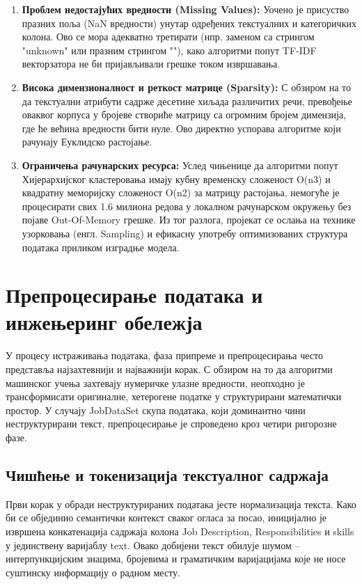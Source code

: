 \documentclass[a4paper,12pt]{report}
\begin{document}
	\begin{enumerate}
	
	\item \textbf{Проблем недостајућих вредности (Missing Values):} Уочено је присуство празних поља (NaN вредности) унутар одређених текстуалних и категоричких колона. Ово се мора адекватно третирати (нпр. заменом са стрингом "unknown" или празним стрингом ""), како алгоритми попут TF-IDF векторзатора не би пријављивали грешке током извршавања.
	
	\item \textbf{Висока димензионалност и реткост матрице (Sparsity):} С обзиром на то да текстуални атрибути садрже десетине хиљада различитих речи, превођење оваквог корпуса у бројеве створиће матрицу са огромним бројем димензија, где ће већина вредности бити нуле. Ово директно успорава алгоритме који рачунају Еуклидско растојање.
	
	\item \textbf{Ограничења рачунарских ресурса:} Услед чињенице да алгоритми попут Хијерархијског кластеровања имају кубну временску сложеност O(n3) и квадратну меморијску сложеност O(n2) за матрицу растојања, немогуће је процесирати свих 1.6 милиона редова у локалном рачунарском окружењу без појаве Out-Of-Memory грешке. Из тог разлога, пројекат се ослања на технике узорковања (енгл. Sampling) и ефикасну употребу оптимизованих структура података приликом изградње модела.
	
	\end{enumerate}
	
	\chapter{Препроцесирање података и инжењеринг обележја}
	У процесу истраживања података, фаза припреме и препроцесирања често представља најзахтевнији и најважнији корак. С обзиром на то да алгоритми машинског учења захтевају нумеричке улазне вредности, неопходно је трансформисати оригиналне, хетерогене податке у структурирани математички простор. У случају JobDataSet скупа података, који доминантно чини неструктурирани текст, препроцесирање је спроведено кроз четири ригорозне фазе.
	
	\section{Чишћење и токенизација текстуалног садржаја}
	Први корак у обради неструктурираних података јесте нормализација текста. Како би се објединио семантички контекст сваког огласа за посао, иницијално је извршена конкатенација садржаја колона Job Description, Responsibilities и skills у јединствену варијаблу text. Овако добијени текст обилује шумом – интерпункцијским знацима, бројевима и граматичким варијацијама које не носе суштинску информацију о радном месту.
	
\end{document}
